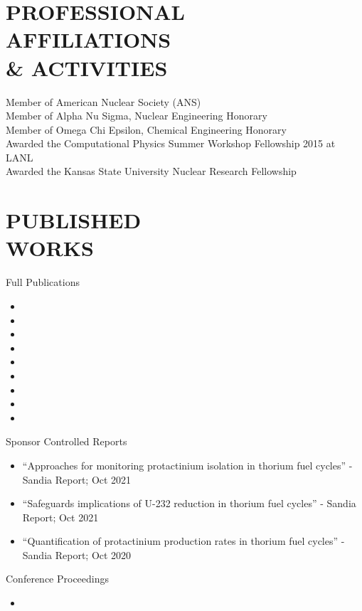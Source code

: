\documentclass[margin, 10pt]{res} %
\begin{document}
\begin{resume}
\section{PROFESSIONAL \\ AFFILIATIONS  \\ \& ACTIVITIES}

Member of American Nuclear Society (ANS) \\
Member of Alpha Nu Sigma, Nuclear Engineering Honorary \\
Member of Omega Chi Epsilon, Chemical Engineering Honorary\\
Awarded the Computational Physics Summer Workshop Fellowship 2015 at LANL\\
Awarded the Kansas State University Nuclear Research Fellowship

\section{PUBLISHED \\ WORKS}
Full Publications
\begin{itemize}
\item {}
\item {}
\item {}
\item {}
\item {}
\item {}
\item {}
\item {}
\item {}
\end{itemize}
Sponsor Controlled Reports
\begin{itemize}
    \item ``Approaches for monitoring protactinium isolation in thorium fuel cycles'' - Sandia Report; Oct 2021
    \item ``Safeguards implications of U-232 reduction in thorium fuel cycles'' - Sandia Report; Oct 2021
    \item ``Quantification of protactinium production rates in thorium fuel cycles'' - Sandia Report; Oct 2020
\end{itemize}
Conference Proceedings
\begin{itemize}
\item {}

\end{itemize}
\end{resume}
\end{document}

